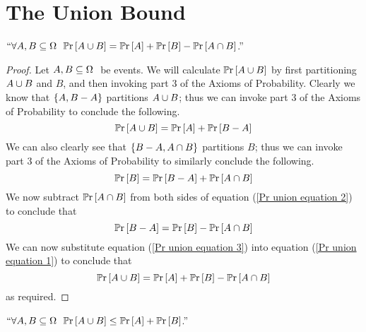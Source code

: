     \section{The Union Bound}
        \begin{theorem}
            $``\forall \subs{A, B}{\Omega} \ \pr{\union{A}{B}} = \pr{A} + \pr{B} - \pr{\intersect{A}{B}}$.''
            \label{Pr union Theorem}
        \end{theorem}
        \begin{proof}
            Let $A, B \subseteq \Omega \ $ be events. We will calculate $\mathbb{P}\mathrm{r} \left[A \cup B\right]$
            by first partitioning $A \cup B$ and $B$, and then invoking part 3 of the Axioms
            of Probability. Clearly we know that $\left\{A, B - A\right\}$ partitions $A \cup B$;
            thus we can invoke part 3 of the Axioms of Probability to conclude the following.
            \begin{equation}
                \mathbb{P}\mathrm{r} \left[A \cup B\right] = \mathbb{P}\mathrm{r} \left[A\right] + \mathbb{P}\mathrm{r} \left[B - A\right]
                \label{Pr union equation 1}
            \end{equation}
            We can also clearly see that $\left\{B - A, A \cap B\right\}$ partitions $B$;
            thus we can invoke part 3 of the Axioms of Probability to similarly conclude the following.
            \begin{equation}
                \mathbb{P}\mathrm{r} \left[B\right] = \mathbb{P}\mathrm{r} \left[B - A\right] + \mathbb{P}\mathrm{r} \left[A \cap B\right]
                \label{Pr union equation 2}
            \end{equation}
            We now subtract $\mathbb{P}\mathrm{r} \left[A \cap B\right]$ from both sides of equation (\ref{Pr union equation 2})
            to conclude that
            \begin{equation}
                \mathbb{P}\mathrm{r} \left[B - A\right] = \mathbb{P}\mathrm{r} \left[B\right] -  \mathbb{P}\mathrm{r} \left[A \cap B\right]
                \label{Pr union equation 3}
            \end{equation}
            We can now substitute equation (\ref{Pr union equation 3}) into equation (\ref{Pr union equation 1})
            to conclude that
            \[
                \mathbb{P}\mathrm{r} \left[A \cup B\right] = \mathbb{P}\mathrm{r} \left[A\right] + \mathbb{P}\mathrm{r} \left[B\right] - \mathbb{P}\mathrm{r} \left[A \cap B\right]
            \]
            as required. \QED
        \end{proof}
        \begin{corollary}
            $``\forall \subs{A, B}{\Omega} \ \pr{\union{A}{B}} \le \pr{A} + \pr{B}$.''
            \label{Union Bound n = 2}
        \end{corollary}
